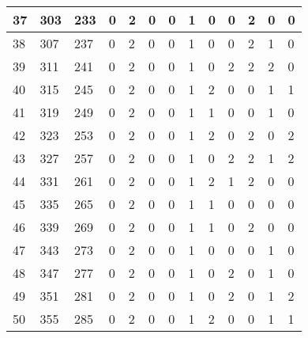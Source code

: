 \begin{sidewaystable}[!h]
\begin{tabular}{|l|l|l|l|l|l|l|l|l|l|l|l|l|}
			37 & 303 & 233 & 0 & 2 & 0 & 0 & 1 & 0 & 0 & 2 & 0 & 0 \\ \hline
			38 & 307 & 237 & 0 & 2 & 0 & 0 & 1 & 0 & 0 & 2 & 1 & 0 \\ \hline
			39 & 311 & 241 & 0 & 2 & 0 & 0 & 1 & 0 & 2 & 2 & 2 & 0 \\ \hline
			40 & 315 & 245 & 0 & 2 & 0 & 0 & 1 & 2 & 0 & 0 & 1 & 1 \\ \hline
			41 & 319 & 249 & 0 & 2 & 0 & 0 & 1 & 1 & 0 & 0 & 1 & 0 \\ \hline
			42 & 323 & 253 & 0 & 2 & 0 & 0 & 1 & 2 & 0 & 2 & 0 & 2 \\ \hline
			43 & 327 & 257 & 0 & 2 & 0 & 0 & 1 & 0 & 2 & 2 & 1 & 2 \\ \hline
			44 & 331 & 261 & 0 & 2 & 0 & 0 & 1 & 2 & 1 & 2 & 0 & 0 \\ \hline
			45 & 335 & 265 & 0 & 2 & 0 & 0 & 1 & 1 & 0 & 0 & 0 & 0 \\ \hline
			46 & 339 & 269 & 0 & 2 & 0 & 0 & 1 & 1 & 0 & 2 & 0 & 0 \\ \hline
			47 & 343 & 273 & 0 & 2 & 0 & 0 & 1 & 0 & 0 & 0 & 1 & 0 \\ \hline
			48 & 347 & 277 & 0 & 2 & 0 & 0 & 1 & 0 & 2 & 0 & 1 & 0 \\ \hline
			49 & 351 & 281 & 0 & 2 & 0 & 0 & 1 & 0 & 2 & 0 & 1 & 2 \\ \hline
			50 & 355 & 285 & 0 & 2 & 0 & 0 & 1 & 2 & 0 & 0 & 1 & 1 \\ \hline
		\end{tabular}
\end{sidewaystable}
\clearpage


